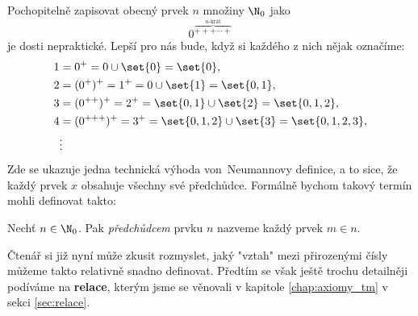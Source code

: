 Pochopitelně zapisovat obecný prvek $n$ množiny $\N_0$ jako
\begin{equation*}
    0^{\overbrace{+++\cdots+}^{n\text{-krát}}}
\end{equation*}
je dosti nepraktické. Lepší pro nás bude, když si každého z nich nějak označíme:
\begin{align*}
    1&=0^+=0\cup\set{0}=\set{0},\\
    2&=(0^+)^+=1^+=0\cup\set{1}=\set{0,1},\\
    3&=(0^{++})^+=2^+=\set{0,1}\cup\set{2}=\set{0,1,2},\\
    4&=(0^{+++})^+=3^+=\set{0,1,2}\cup\set{3}=\set{0,1,2,3},\\
    &\vdots
\end{align*}
Zde se ukazuje jedna technická výhoda von~Neumannovy definice, a to sice, že každý prvek $x$ obsahuje všechny své předchůdce. Formálně bychom takový termín mohli definovat takto:
\begin{definition}[Předchůdce]\label{def:predchudce}
    Nechť $n\in\N_0$. Pak \emph{předchůdcem} prvku $n$ nazveme každý prvek $m\in n$.
\end{definition}
Čtenář si již nyní může zkusit rozmyslet, jaký "vztah" mezi přirozenými čísly můžeme takto relativně snadno definovat. Předtím se však ještě trochu detailněji podíváme na \textbf{relace}, kterým jsme se věnovali v kapitole \ref{chap:axiomy_tm} v sekci \ref{sec:relace}.